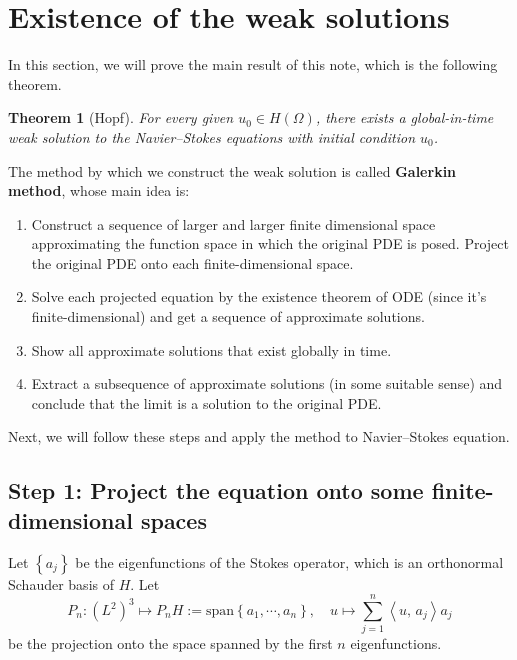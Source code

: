 \documentclass[a4paper, 12pt, oneside]{amsart}
\newtheorem{theorem}{Theorem}
\theoremstyle{definition}
\theoremstyle{remark}
\newtheorem*{remark}{Remark}
\newcommand{\bk}[2]{\left\langle #1,\, #2 \right\rangle}
\newcommand{\set}[1]{\left\{ #1 \right\}}
\begin{document}
\section{Existence of the weak solutions}
\label{sec: Galerkin}

In this section, we will prove the main result of this note, which is the following theorem.

\begin{theorem}[Hopf]
    \label{thm: Hopf, exist weak sol}
    For every given $u_0\in H(\Omega)$, there exists a global-in-time weak solution to the Navier--Stokes equations with initial condition $u_0$.
\end{theorem}


The method by which we construct the weak solution is called \textbf{Galerkin method}, whose main idea is: 
\begin{enumerate}[label=\arabic*.]
    \item Construct a sequence of larger and larger finite dimensional space approximating the function space in which the original PDE is posed. Project the original PDE onto each finite-dimensional space.
    \item Solve each projected equation by the existence theorem of ODE (since it's finite-dimensional) and get a sequence of approximate solutions.
    \item Show all approximate solutions that exist globally in time.
    \item Extract a subsequence of approximate solutions (in some suitable sense) and conclude that the limit is a solution to the original PDE.
\end{enumerate}
Next, we will follow these steps and apply the method to Navier--Stokes equation.

\subsection*{Step 1: Project the equation onto some finite-dimensional spaces}

Let $\set{a_j}$ be the eigenfunctions of the Stokes operator, which is an orthonormal Schauder basis of $H$. Let
\[
    P_n: (L^2)^3\mapsto P_nH:=\text{span}\set{a_1, \cdots, a_n},\quad u\mapsto\sum_{j=1}^n \bk{u}{a_j}a_j
\]
be the projection onto the space spanned by the first $n$ eigenfunctions. 
\end{document}
